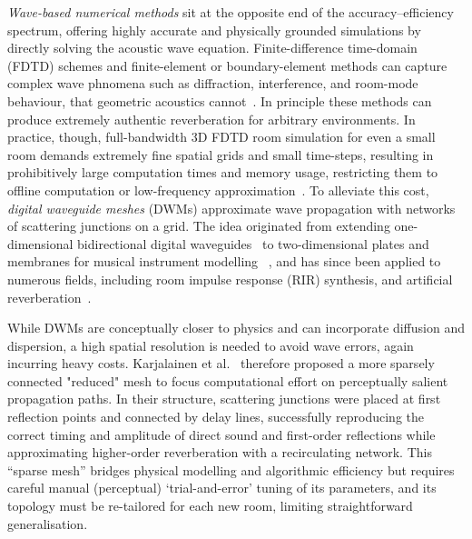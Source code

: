 \documentclass[journal]{IEEEtran}
\begin{document}
\emph{Wave-based numerical methods} sit at the opposite end of the accuracy–efficiency spectrum, offering highly accurate and physically grounded simulations by directly solving the acoustic wave equation. Finite-difference time-domain (FDTD) schemes and finite-element or boundary-element methods can capture complex wave phnomena such as diffraction, interference, and room-mode behaviour, that geometric acoustics cannot~\cite{Bilbao2004}.
In principle these methods can produce extremely authentic reverberation for arbitrary environments. In practice, though, full-bandwidth 3D
FDTD room simulation for even a small room demands extremely fine spatial grids and small time-steps, resulting in prohibitively large computation times and memory usage, restricting them to offline computation or low-frequency approximation~\cite{murphy2014source_excitation_fdtd}. To alleviate this cost,
\emph{digital waveguide meshes} (DWMs) approximate wave propagation with
networks of scattering junctions on a grid. The idea originated from extending one-dimensional bidirectional digital waveguides~\cite{smith1992physicalmodellingusingdigitalwaveguides} to two-dimensional plates and membranes for musical instrument modelling ~\cite{vanduyne1993mesh}, and has since been applied to numerous fields, including room impulse response (RIR) synthesis, and artificial reverberation~\cite{murphy2007_DWMreview}.

While DWMs are conceptually closer to physics and can incorporate diffusion and dispersion, a high spatial resolution is needed to avoid wave errors, again incurring heavy costs. Karjalainen et al.~\cite{karjalainen2005} therefore proposed a more sparsely connected "reduced" mesh to focus computational effort on perceptually salient propagation paths. In their structure, scattering junctions were placed at first reflection points and connected by delay lines, successfully reproducing the correct timing and amplitude of direct sound and first-order reflections while approximating higher-order reverberation with a recirculating network. This “sparse mesh” bridges physical modelling and algorithmic efficiency but requires careful manual (perceptual) ‘trial-and-error’ tuning of its parameters, and its topology must be re-tailored for each new room, limiting straightforward generalisation.
\end{document}
